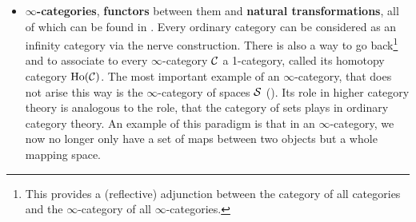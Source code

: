 \begin{itemize}
    \item \textbf{$\infty$-categories}, \textbf{functors} between them and \textbf{natural transformations}, all of which can be found in \cite[Chapter~1]{HigherToposTheory}. Every ordinary category can be considered as an infinity category via the nerve construction. There is also a way to go back\footnote{This provides a (reflective) adjunction between the category of all categories and the $\infty$-category of all $\infty$-categories.} and to associate to every $\infty$-category $\mathcal{C}$ a 1-category, called its homotopy category $\operatorname{Ho}(\mathcal{C})$.
    The most important example of an $\infty$-category, that does not arise this way is the $\infty$-category of spaces $\mathcal{S}$ (\cite[Section~1.2.6]{HigherToposTheory}). Its role in higher category theory is analogous to the role, that the category of sets plays in ordinary category theory. An example of this paradigm is that in an $\infty$-category, we now no longer only have a set of maps between two objects but a whole mapping space. 
    

\end{itemize}
